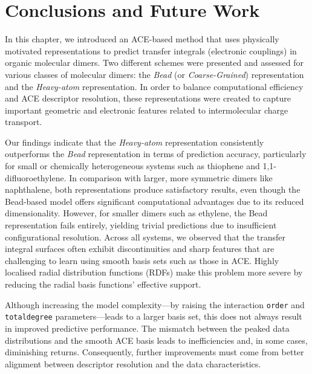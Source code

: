 \section{Conclusions and Future Work} \label{sec:4.4}
In this chapter, we introduced an ACE-based method that uses physically motivated representations to predict transfer integrals (electronic couplings) in organic molecular dimers. Two different schemes were presented and assessed for various classes of molecular dimers: the \textit{Bead} (or \textit{Coarse-Grained}) representation and the \textit{Heavy-atom} representation. In order to balance computational efficiency and ACE descriptor resolution, these representations were created to capture important geometric and electronic features related to intermolecular charge transport.

Our findings indicate that the \textit{Heavy-atom} representation consistently outperforms the \textit{Bead} representation in terms of prediction accuracy, particularly for small or chemically heterogeneous systems such as thiophene and 1,1-difluoroethylene. In comparison with larger, more symmetric dimers like naphthalene, both representations produce satisfactory results, even though the Bead-based model offers significant computational advantages due to its reduced dimensionality. However, for smaller dimers such as ethylene, the Bead representation fails entirely, yielding trivial predictions due to insufficient configurational resolution. Across all systems, we observed that the transfer integral surfaces often exhibit discontinuities and sharp features that are challenging to learn using smooth basis sets such as those in ACE. Highly localised radial distribution functions (RDFs) make this problem more severe by reducing the radial basis functions' effective support.

Although increasing the model complexity—by raising the interaction \texttt{order} and \texttt{totaldegree} parameters—leads to a larger basis set, this does not always result in improved predictive performance. The mismatch between the peaked data distributions and the smooth ACE basis leads to inefficiencies and, in some cases, diminishing returns. Consequently, further improvements must come from better alignment between descriptor resolution and the data characteristics.

